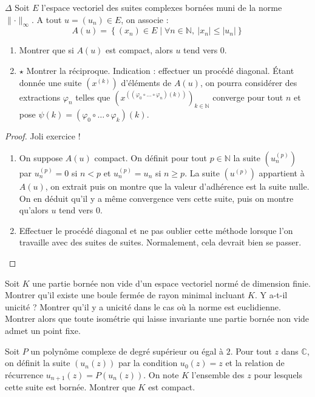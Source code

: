 \documentclass[french,a4paper]{article}
\newcommand{\N}{\mathbb{N}}
\newcommand{\C}{\mathbb{C}}
\theoremstyle{plain}
\theoremstyle{definition}
\theoremstyle{remark}
\begin{document}
\begin{ex}[Moulin.09]{$\Delta$}
	Soit $E$ l'espace vectoriel des suites complexes bornées muni de la norme $\lVert\cdot\rVert_\infty$. A tout $u=(u_n)\in E$, on associe : $$A(u)=\left\{(x_n)\in E\mid \forall n\in\N,\ \lvert x_n\rvert \leqslant\lvert u_n\rvert\right\}$$
	\begin{enumerate}
		\item  Montrer que si $A(u)$ est compact, alors $u$ tend vers $0$.
		\item $\star$ Montrer la réciproque. Indication : effectuer un procédé diagonal. Étant donnée une suite $(x^{(k)})$ d'éléments de $A(u)$, on pourra considérer des extractions $\varphi_n$ telles que $\left(x^{\left((\varphi_0\circ\ldots\circ\varphi_n)(k)\right)}\right)_{k\in\N}$ converge pour tout $n$ et pose $\psi(k)=(\varphi_0\circ\ldots\circ\varphi_k)(k)$.
	\end{enumerate}
\end{ex}
\begin{proof}
	Joli exercice !
	\begin{enumerate}
		\item On suppose $A(u)$ compact. On définit pour tout $p\in\N$ la suite $(u_n^{(p)})$ par $u_n^{(p)}=0$ si $n<p$ et $u_n^{(p)}=u_n$ si $n\geqslant p$. La suite $(u^{(p)})$ appartient à $A(u)$, on extrait puis on montre que la valeur d'adhérence est la suite nulle. On en déduit qu'il y a même convergence vers cette suite, puis on montre qu'alors $u$ tend vers $0$.
		\item Effectuer le procédé diagonal et ne pas oublier cette méthode lorsque l'on travaille avec des suites de suites. Normalement, cela devrait bien se passer.
	\end{enumerate}
\end{proof}

\begin{ex}[Moulin.10]{}
	Soit $K$ une partie bornée non vide d'un espace vectoriel normé de dimension finie. Montrer qu'il existe une boule fermée de rayon minimal incluant $K$. Y a-t-il unicité ? Montrer qu'il y a unicité dans le cas où la norme est euclidienne. Montrer alors que toute isométrie qui laisse invariante une partie bornée non vide admet un point fixe.
\end{ex}

\begin{ex}[Moulin.11]{}
	Soit $P$ un polynôme complexe de degré supérieur ou égal à $2$. Pour tout $z$ dans $\C$, on définit la suite $(u_n(z))$ par la condition $u_0(z)=z$ et la relation de récurrence $u_{n+1}(z)=P(u_n(z))$. On note $K$ l'ensemble des $z$ pour lesquels cette suite est bornée. Montrer que $K$ est compact.
\end{ex}
\end{document}
